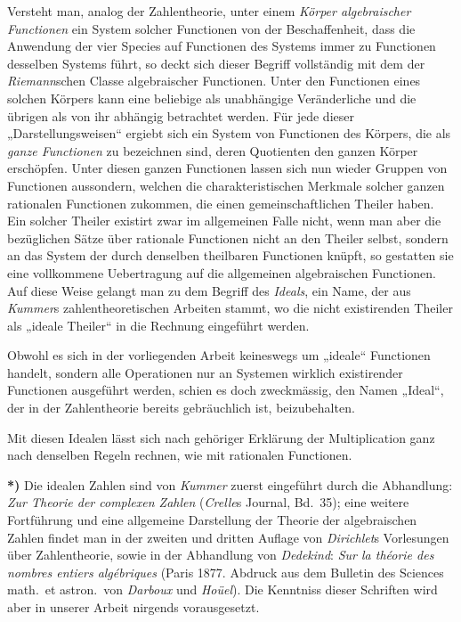 \documentclass{article}
\begin{document}
Versteht man, analog der Zahlentheorie, unter einem \emph{Körper algebraischer Functionen} ein System solcher Functionen von der Beschaffenheit, dass die Anwendung der vier Species auf Functionen des Systems immer zu Functionen desselben Systems führt, so deckt sich dieser Begriff vollständig mit dem der \emph{Riemann}schen Classe algebraischer Functionen. Unter den Functionen eines solchen Körpers kann eine beliebige als unabhängige Veränderliche und die übrigen als von ihr abhängig betrachtet werden. Für jede dieser „Darstellungsweisen“ ergiebt sich ein System von Functionen des Körpers, die als \emph{ganze Functionen} zu bezeichnen sind, deren Quotienten den ganzen Körper erschöpfen. Unter diesen ganzen Functionen lassen sich nun wieder Gruppen von Functionen aussondern, welchen die charakteristischen Merkmale solcher ganzen rationalen Functionen zukommen, die einen gemeinschaftlichen Theiler haben. Ein solcher Theiler existirt zwar im allgemeinen Falle nicht, wenn man aber die bezüglichen Sätze über rationale Functionen nicht an den Theiler selbst, sondern an das System der durch denselben theilbaren Functionen knüpft, so gestatten sie eine vollkommene Uebertragung auf die allgemeinen algebraischen Functionen. Auf diese Weise gelangt man zu dem Begriff des \emph{Ideals}, ein Name, der aus \emph{Kummer}s zahlentheoretischen Arbeiten stammt, wo die nicht existirenden Theiler als „ideale Theiler“ in die Rechnung eingeführt werden.

Obwohl es sich in der vorliegenden Arbeit keineswegs um „ideale“ Functionen handelt, sondern alle Operationen nur an Systemen wirklich existirender Functionen ausgeführt werden, schien es doch zweckmässig, den Namen „Ideal“, der in der Zahlentheorie bereits gebräuchlich ist, beizubehalten.

Mit diesen Idealen lässt sich nach gehöriger Erklärung der Multiplication ganz nach denselben Regeln rechnen, wie mit rationalen Functionen.

\textbf{*)} Die idealen Zahlen sind von \emph{Kummer} zuerst eingeführt durch die Abhandlung: \emph{Zur Theorie der complexen Zahlen} (\emph{Crelle}s Journal, Bd.~35); eine weitere Fortführung und eine allgemeine Darstellung der Theorie der algebraischen Zahlen findet man in der zweiten und dritten Auflage von \emph{Dirichlet}s Vorlesungen über Zahlentheorie, sowie in der Abhandlung von \emph{Dedekind}: \emph{Sur la théorie des nombres entiers algébriques} (Paris 1877. Abdruck aus dem Bulletin des Sciences math.\ et astron.\ von \emph{Darboux} und \emph{Hoüel}). Die Kenntniss dieser Schriften wird aber in unserer Arbeit nirgends vorausgesetzt.
\end{document}

